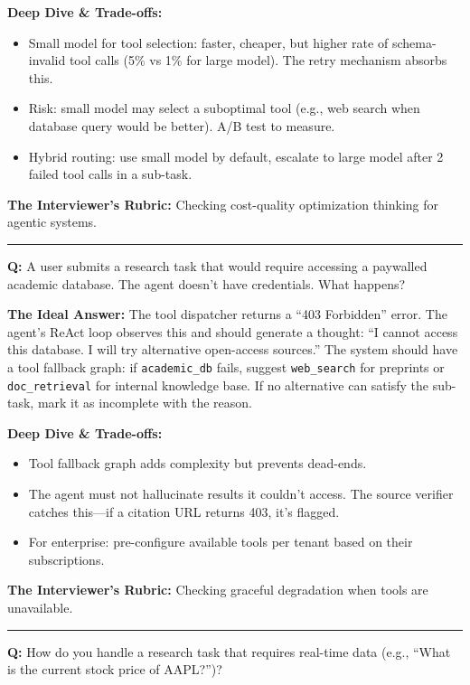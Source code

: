 \textbf{Deep Dive \& Trade-offs:}
\begin{itemize}
  \item Small model for tool selection: faster, cheaper, but higher rate of schema-invalid tool calls (5\% vs 1\% for large model). The retry mechanism absorbs this.
  \item Risk: small model may select a suboptimal tool (e.g., web search when database query would be better). A/B test to measure.
  \item Hybrid routing: use small model by default, escalate to large model after 2 failed tool calls in a sub-task.
\end{itemize}

\textbf{The Interviewer's Rubric:} Checking cost-quality optimization thinking for agentic systems.

\bigskip\hrule\bigskip

\textbf{Q:} A user submits a research task that would require accessing a paywalled academic database. The agent doesn't have credentials. What happens?

\textbf{The Ideal Answer:} The tool dispatcher returns a ``403 Forbidden'' error. The agent's ReAct loop observes this and should generate a thought: ``I cannot access this database. I will try alternative open-access sources.'' The system should have a tool fallback graph: if \texttt{academic\_db} fails, suggest \texttt{web\_search} for preprints or \texttt{doc\_retrieval} for internal knowledge base. If no alternative can satisfy the sub-task, mark it as incomplete with the reason.

\textbf{Deep Dive \& Trade-offs:}
\begin{itemize}
  \item Tool fallback graph adds complexity but prevents dead-ends.
  \item The agent must not hallucinate results it couldn't access. The source verifier catches this---if a citation URL returns 403, it's flagged.
  \item For enterprise: pre-configure available tools per tenant based on their subscriptions.
\end{itemize}

\textbf{The Interviewer's Rubric:} Checking graceful degradation when tools are unavailable.

\bigskip\hrule\bigskip

\textbf{Q:} How do you handle a research task that requires real-time data (e.g., ``What is the current stock price of AAPL?'')?


